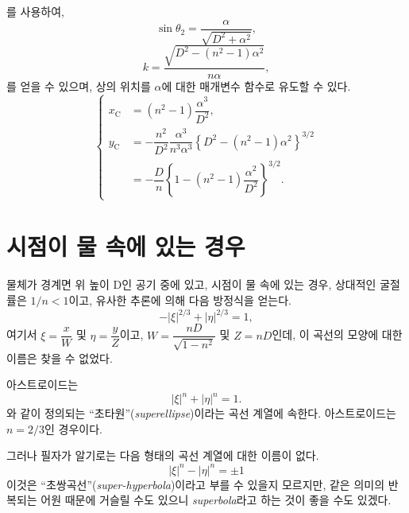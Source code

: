 \documentclass[twocolumn]{article}
\begin{document}
	를 사용하여,
	$$\sin\theta_2 = \dfrac{\alpha}{\sqrt{D^2+\alpha^2}},$$
	$$k = \dfrac{\sqrt{D^2-(n^2-1)\alpha^2}}{n\alpha},$$
	를 얻을 수 있으며, 
	상의 위치를 $\alpha$에 대한 매개변수 함수로 유도할 수 있다.
	$$ \left\{ 
	\begin{aligned}
		x_{\mathrm{C}}^{} &= (n^2-1)\dfrac{\alpha^3}{D^2},\\
		y_{\mathrm{C}}^{} &= -\dfrac{n^2}{D^2}\dfrac{\alpha^3}{n^3\alpha^3}\left\{ D^2-(n^2-1)\alpha^2 \right\}^{3/2}\\
		&=-\dfrac{D}{n}\left\{ 1-(n^2-1)\dfrac{\alpha^2}{D^2} \right\}^{3/2}.
	\end{aligned}
	\right.$$
	
\section{시점이 물 속에 있는 경우}

물체가 경계면 위 높이 D인 공기 중에 있고, 
시점이 물 속에 있는 경우, 상대적인 굴절률은 $1/n < 1$이고, 
유사한 추론에 의해 다음 방정식을 얻는다.
$$ - \left| \xi \right|^{2/3} + \left| \eta \right|^{2/3} = 1, $$
여기서 $\xi = \dfrac{x}{W} $ 및 $\eta = \dfrac{y}{Z}$이고, 
$W = \dfrac{nD}{\sqrt{1-n^2}}$ 및 $Z = nD$인데,  
이 곡선의 모양에 대한 이름은 찾을 수 없었다. 

아스트로이드는 
$$ \left| \xi \right|^{n} + \left| \eta \right|^{n} = 1. $$
와 같이 정의되는 ``초타원''(\emph{superellipse})이라는 곡선 계열에 속한다. 
아스트로이드는 $n=2/3$인 경우이다.
 
그러나 필자가 알기로는 다음 형태의 곡선 계열에 대한 이름이 없다.
$$ \left| \xi \right|^{n} - \left| \eta \right|^{n} = \pm 1 $$
이것은 ``초쌍곡선''(\emph{super-hyperbola})이라고 부를 수 있을지 모르지만, 
같은 의미의 반복되는 어원 때문에 거슬릴 수도 있으니 \emph{superbola}라고 하는 것이 
좋을 수도 있겠다.
\end{document}
